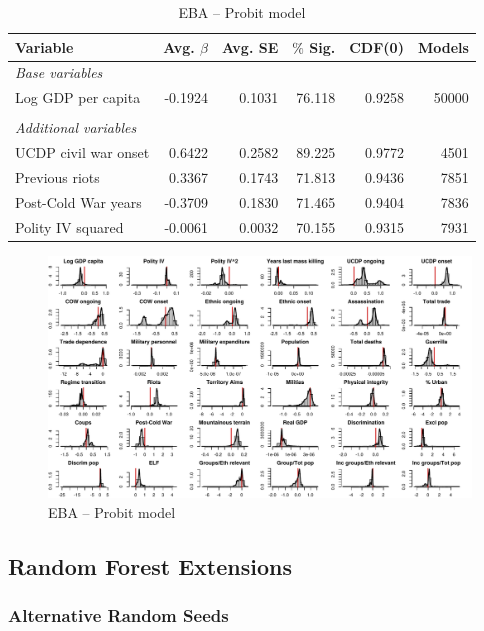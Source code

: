 \begin{table}[H]
\centering
\begin{tabular}{lrrrrr}
\hline
\textbf{Variable} & \textbf{Avg. $\beta$} & \textbf{Avg. SE} & \textbf{$\%$ Sig.} & \textbf{CDF(0)} & \textbf{Models} \\ \hline
\textit{Base variables} &  &  &  &  &  \\
Log GDP per capita & -0.1924 & 0.1031 & 76.118 & 0.9258 & 50000 \\
 &  &  &  &  &  \\
\textit{Additional variables} &  &  &  &  &  \\
UCDP civil war onset & 0.6422 & 0.2582 & 89.225 & 0.9772 & 4501 \\
Previous riots & 0.3367 & 0.1743 & 71.813 & 0.9436 & 7851 \\
Post-Cold War years & -0.3709 & 0.1830 & 71.465 & 0.9404 & 7836 \\
Polity IV squared & -0.0061 & 0.0032 & 70.155 & 0.9315 & 7931 \\ \hline
\end{tabular}
\caption{EBA -- Probit model}
\label{tab:eba1}
\end{table}

\clearpage
\begin{figure}
    \centering
    \includegraphics[width=\textwidth]{images/mk-probit.pdf}
    \caption{EBA -- Probit model}
    \label{fig:mk-probit}
\end{figure}
\clearpage

\subsection{Random Forest Extensions}
\label{sec:mk-rfe}

\subsubsection{Alternative Random Seeds}

